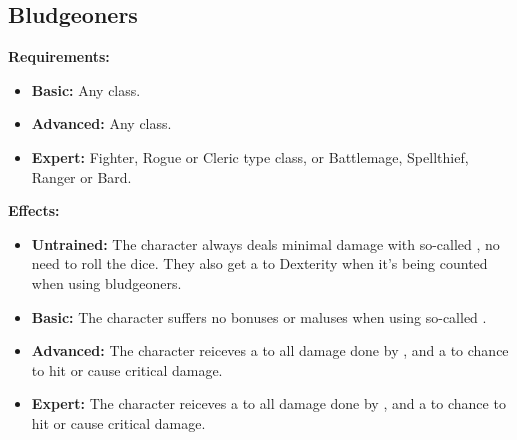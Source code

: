 \documentclass[openany,10pt,a4paper]{book}
\begin{document}
\subsection{Bludgeoners}
\begin{table}[!ht]
\centering
{}
\end{table}
\textbf{Requirements:}
\begin{itemize}
	\item \textbf{Basic:} Any class.
	\item \textbf{Advanced:} Any class.
	\item \textbf{Expert:} Fighter, Rogue or Cleric type class, or Battlemage, Spellthief, Ranger or Bard.
\end{itemize}
\textbf{Effects:}
\begin{itemize}
	\item \textbf{Untrained:} The character always deals minimal damage with so-called  , no need to roll the dice. They also get a  to Dexterity when it's being counted when using bludgeoners.
	\item \textbf{Basic:} The character suffers no bonuses or maluses when using so-called  .
	\item \textbf{Advanced:} The character reiceves a  to all damage done by  , and a  to chance to hit or cause critical damage.
	\item \textbf{Expert:} The character reiceves a  to all damage done by  , and a  to chance to hit or cause critical damage.
\end{itemize}\newpage
\end{document}
